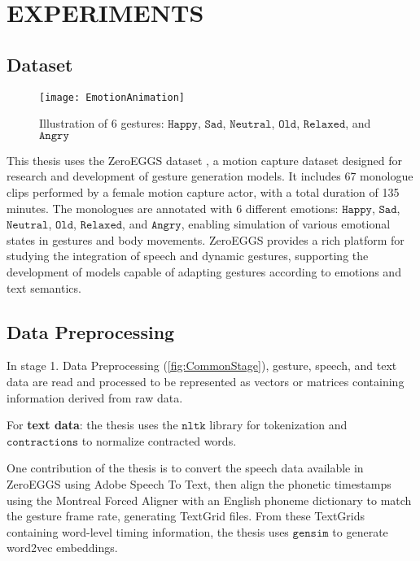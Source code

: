 \chapter{EXPERIMENTS}
\label{Chapter4}

\section{Dataset}

\begin{figure}[H]
	\centering
	\texttt{[image: EmotionAnimation]}
	\caption{Illustration of 6 gestures: $\texttt{Happy}$, $\texttt{Sad}$, $\texttt{Neutral}$, $\texttt{Old}$, $\texttt{Relaxed}$, and $\texttt{Angry}$}
\end{figure}

This thesis uses the ZeroEGGS dataset \cite{ghorbani2022zeroeggszeroshotexamplebasedgesture}, a motion capture dataset designed for research and development of gesture generation models. It includes 67 monologue clips performed by a female motion capture actor, with a total duration of 135 minutes. The monologues are annotated with 6 different emotions: $\texttt{Happy}$, $\texttt{Sad}$, $\texttt{Neutral}$, $\texttt{Old}$, $\texttt{Relaxed}$, and $\texttt{Angry}$, enabling simulation of various emotional states in gestures and body movements. ZeroEGGS provides a rich platform for studying the integration of speech and dynamic gestures, supporting the development of models capable of adapting gestures according to emotions and text semantics.

\section{Data Preprocessing}
\label{sec:Preprocessing}

In stage {1. Data Preprocessing} (\autoref{fig:CommonStage}), gesture, speech, and text data are read and processed to be represented as vectors or matrices containing information derived from raw data.

For \textbf{text data}: the thesis uses the $\texttt{nltk}$ library for tokenization and $\texttt{contractions}$ to normalize contracted words.

One contribution of the thesis is to convert the speech data available in ZeroEGGS using Adobe Speech To Text, then align the phonetic timestamps using the Montreal Forced Aligner \cite{saxon2020robust} with an English phoneme dictionary to match the gesture frame rate, generating TextGrid files. From these TextGrids containing word-level timing information, the thesis uses $\texttt{gensim}$ to generate word2vec embeddings.

